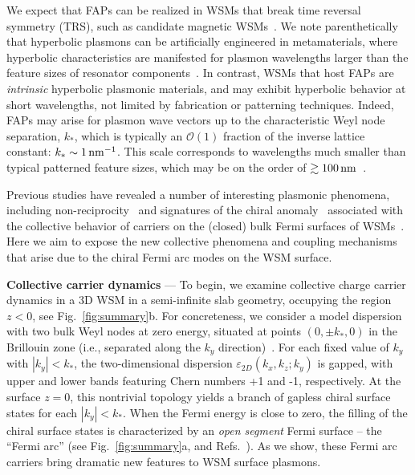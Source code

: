 \documentclass[aps,twocolumn,prl,groupedaddress]{revtex4}
\renewcommand{\epsilon}{\varepsilon}
\begin{document}
We expect that FAPs can be realized in WSMs that break time reversal symmetry (TRS), such as candidate magnetic WSMs~\cite{sushkov,borisenko,yingran,wan,balents,tong,bulmash,bernevig16}.
We note parenthetically that hyperbolic plasmons can be artificially engineered in metamaterials, where hyperbolic characteristics are manifested for plasmon wavelengths larger than the feature sizes of resonator components~\cite{hyperbolicrev}. 
In contrast, WSMs that host FAPs are {\it intrinsic} hyperbolic plasmonic materials, and may exhibit hyperbolic behavior at 
short wavelengths, not limited by fabrication or patterning techniques. 
Indeed, FAPs may arise for plasmon wave vectors up to 
the characteristic Weyl node separation, $k_*$, which is typically an $\mathcal{O}(1)$ fraction of the inverse lattice constant: 
$k_* \sim 1 \, {\rm nm}^{-1}$. 
This scale 
corresponds to wavelengths much smaller than typical patterned feature sizes, which may be on the order of $\gtrsim 100\, {\rm nm}$~\cite{hyperbolicrev}. 

Previous studies have revealed a number of interesting plasmonic phenomena, including non-reciprocity~\cite{hoffman16} and signatures of the chiral anomaly~\cite{sonspivak,pesin,xiao,spivakandreev,hoffman16} 
associated with the collective behavior of carriers on the (closed) bulk Fermi surfaces of WSMs~\cite{Rosenstein, Cortijo, Lozovik}.
Here we aim to expose the new collective phenomena and coupling mechanisms that arise due to the chiral Fermi arc modes on the WSM surface.


\vspace{2mm}
{\bf Collective carrier dynamics} --- 
To begin, we
examine collective charge carrier dynamics 
in a 3D WSM in 
a semi-infinite slab geometry, occupying the region $z < 0$, see Fig.~\ref{fig:summary}b.
For concreteness, we consider a model dispersion with two bulk Weyl nodes at zero energy, situated at points $(0, \pm k_*, 0)$ in the Brillouin zone (i.e., separated along the $k_y$ direction)~\cite{SI}. 
For each fixed value of $k_y$ with $|k_y| < k_*$, the two-dimensional dispersion $\epsilon_{2D}(k_x, k_z; k_y)$ is gapped, with 
upper and lower bands featuring Chern numbers +1 and -1, respectively. At the surface $z = 0$, this nontrivial topology yields a branch of gapless chiral surface states for each $|k_y| < k_*$. 
When the Fermi energy is close to zero, 
the filling of the chiral surface states is characterized by an {\it open segment} Fermi surface -- the ``Fermi arc'' (see Fig.~\ref{fig:summary}a, and Refs.~\cite{wan,yingran,balents}).
As we show, these Fermi arc carriers bring dramatic new features to 
WSM surface plasmons. 
\end{document}
